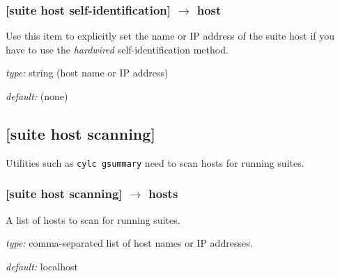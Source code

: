 \subsubsection[host]{[suite host self-identification] $\rightarrow$ host }

Use this item to explicitly set the name or IP address of the suite host  
if you have to use the {\em hardwired} self-identification method.
\begin{myitemize}
\item {\em type:} string (host name or IP address)
\item {\em default:} (none)
\end{myitemize}

\subsection{[suite host scanning]}

Utilities such as \lstinline=cylc gsummary= need to scan hosts for
running suites.

\subsubsection[hosts]{[suite host scanning] $\rightarrow$ hosts }

A list of hosts to scan for running suites.
\begin{myitemize}
\item {\em type:} comma-separated list of host names or IP addresses.
\item {\em default:} localhost
\end{myitemize}

